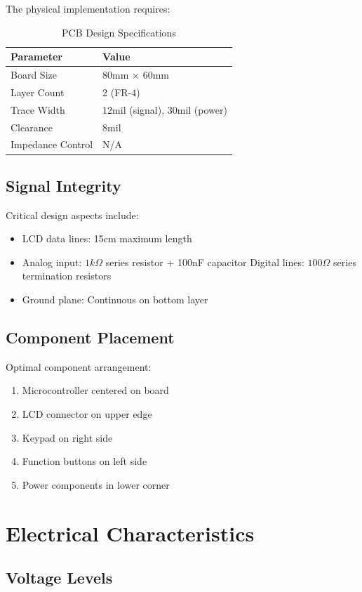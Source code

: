 \documentclass{article}
\begin{document}
The physical implementation requires:

\begin{table}[h]
\centering
\caption{PCB Design Specifications}
\begin{tabular}{|l|l|}
\hline
\textbf{Parameter} & \textbf{Value} \\
\hline
Board Size & 80mm × 60mm \\
Layer Count & 2 (FR-4) \\
Trace Width & 12mil (signal), 30mil (power) \\
Clearance & 8mil \\
Impedance Control & N/A \\
\hline
\end{tabular}
\end{table}

\subsection{Signal Integrity}

Critical design aspects include:
\begin{itemize}
\item LCD data lines: 15cm maximum length
\item Analog input: $1k\Omega$ series resistor + 100nF capacitor
\iem Digital lines: $100\Omega$ series termination resistors
\item Ground plane: Continuous on bottom layer
\end{itemize}

\subsection{Component Placement}

Optimal component arrangement:
\begin{enumerate}
\item Microcontroller centered on board
\item LCD connector on upper edge
\item Keypad on right side
\item Function buttons on left side
\item Power components in lower corner
\end{enumerate}


\section{Electrical Characteristics}
\subsection{Voltage Levels}
\end{document}

